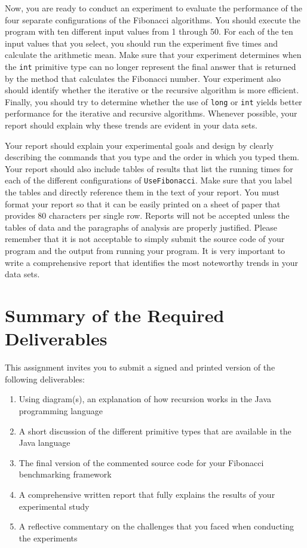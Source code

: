 Now, you are ready to conduct an experiment to evaluate the performance of the four separate configurations of the
Fibonacci algorithms. You should execute the program with ten different input values from 1 through 50. For each of the
ten input values that you select, you should run the experiment five times and calculate the arithmetic mean. Make sure
that your experiment determines when the {\tt int} primitive type can no longer represent the final answer that is
returned by the method that calculates the Fibonacci number. Your experiment also should identify whether the iterative
or the recursive algorithm is more efficient.  Finally, you should try to determine whether the use of {\tt long} or
{\tt int} yields better performance for the iterative and recursive algorithms. Whenever possible, your report should
explain why these trends are evident in your data sets.

Your report should explain your experimental goals and design by clearly describing the commands that you type and the
order in which you typed them. Your report should also include tables of results that list the running times for each of
the different configurations of {\tt UseFibonacci}.  Make sure that you label the tables and directly reference them in
the text of your report. You must format your report so that it can be easily printed on a sheet of paper that provides
80 characters per single row. Reports will not be accepted unless the tables of data and the paragraphs of analysis are
properly justified.  Please remember that it is not acceptable to simply submit the source code of your program and the
output from running your program. It is very important to write a comprehensive report that identifies the most
noteworthy trends in your data sets.

\section*{Summary of the Required Deliverables}

  This assignment invites you to submit a signed and printed version of the following deliverables: 

  \begin{enumerate} 
  \itemsep0pt
  \item Using diagram(s), an explanation of how recursion works in the Java programming language

  \item A short discussion of the different primitive types that are available in the Java language

  \item The final version of the commented source code for your Fibonacci benchmarking framework

  \item A comprehensive written report that fully explains the results of your experimental study

  \item A reflective commentary on the challenges that you faced when conducting the experiments
   
  \end{enumerate}

